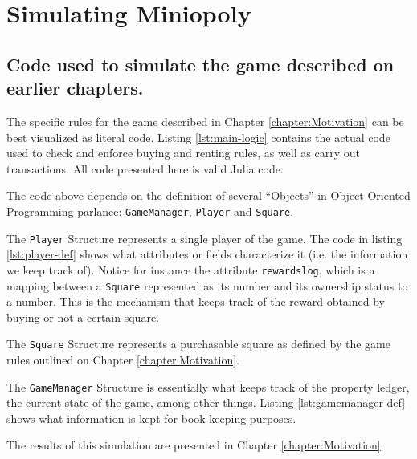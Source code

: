 \chapter{Simulating Miniopoly}
\label{appendix:MiniopolySim}

\section*{Code used to simulate the game described on earlier 
chapters.}

The specific rules for the game described in Chapter 
\ref{chapter:Motivation} can be best visualized as literal 
code. Listing \ref{lst:main-logic} contains the actual code 
used to check and enforce buying and renting rules, as well as 
carry out transactions. All code presented here is valid Julia 
code.



The code above depends on the definition of several ``Objects'' 
in Object Oriented Programming parlance: 
\lstinline{GameManager}, \lstinline{Player} and 
\lstinline{Square}.

The \lstinline{Player} Structure represents a single player of the game. The
code in listing \ref{lst:player-def} shows what attributes or fields
characterize it (i.e. the information we keep track of). Notice for instance the
attribute \lstinline{rewardslog}, which is a mapping between a 
\lstinline{Square} represented as its number and its ownership status to a
number. This is the mechanism that keeps track of the reward obtained by buying
or not a certain square.



The \lstinline{Square} Structure represents a purchasable 
square as defined by the game rules outlined on Chapter 
\ref{chapter:Motivation}. 



The \lstinline{GameManager} Structure is essentially what keeps 
track of the property ledger, the current state of the game, 
among other things. Listing \ref{lst:gamemanager-def} shows 
what information is kept for book-keeping purposes.



The results of this simulation are presented in Chapter
\ref{chapter:Motivation}.